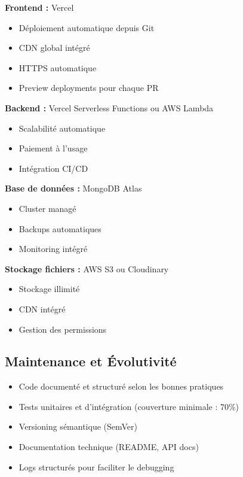 \documentclass[12pt,a4paper]{article}
\begin{document}
\textbf{Frontend :} Vercel
\begin{itemize}[leftmargin=*]
    \item Déploiement automatique depuis Git
    \item CDN global intégré
    \item HTTPS automatique
    \item Preview deployments pour chaque PR
\end{itemize}

\textbf{Backend :} Vercel Serverless Functions ou AWS Lambda
\begin{itemize}[leftmargin=*]
    \item Scalabilité automatique
    \item Paiement à l'usage
    \item Intégration CI/CD
\end{itemize}

\textbf{Base de données :} MongoDB Atlas
\begin{itemize}[leftmargin=*]
    \item Cluster managé
    \item Backups automatiques
    \item Monitoring intégré
\end{itemize}

\textbf{Stockage fichiers :} AWS S3 ou Cloudinary
\begin{itemize}[leftmargin=*]
    \item Stockage illimité
    \item CDN intégré
    \item Gestion des permissions
\end{itemize}

\subsection{Maintenance et Évolutivité}

\begin{itemize}[leftmargin=*]
    \item Code documenté et structuré selon les bonnes pratiques
    \item Tests unitaires et d'intégration (couverture minimale : 70\%)
    \item Versioning sémantique (SemVer)
    \item Documentation technique (README, API docs)
    \item Logs structurés pour faciliter le debugging
\end{itemize}
\end{document}
